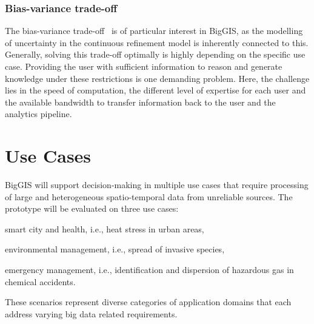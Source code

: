 \documentclass{sig-alternate-05-2015}
\begin{document}
\subsubsection{Bias-variance trade-off}
The bias-variance trade-off~\cite{Hastie2009} is of particular
interest in BigGIS, as the modelling of uncertainty in the continuous
refinement model is inherently connected to this. Generally, solving this
trade-off optimally is highly depending on the specific use case. Providing the
user with sufficient information to reason and generate knowledge under these
restrictions is one demanding problem. Here, the challenge lies in the speed
of computation, the different level of expertise for each user and the
available bandwidth to transfer information back to the user and the analytics
pipeline.

\section{Use Cases}
\label{sec:use}
BigGIS will support decision-making in multiple use cases that require
processing of large and heterogeneous spatio-temporal data from unreliable
sources. The prototype will be evaluated on three use cases: 
\begin{inparaenum}[(1)]
	\item smart city and health, i.e., heat stress in urban areas,
	\item environmental management, i.e., spread of invasive species,
	\item emergency management, i.e., identification and dispersion of hazardous
gas in chemical accidents.
\end{inparaenum}
These scenarios represent diverse categories of application domains that each 
address varying big data related requirements. 
\end{document}
